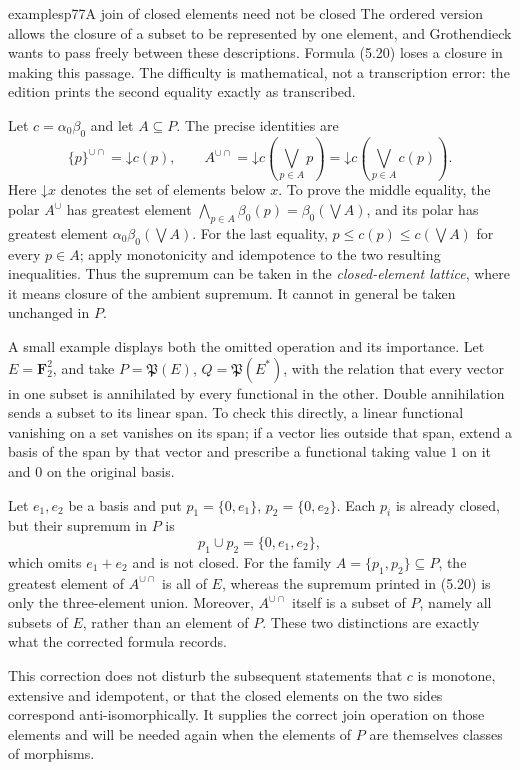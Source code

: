 \begin{dcomment}{examples}{p77}{A join of closed elements need not be closed}
The ordered version allows the closure of a subset to be represented by one element, and Grothendieck wants to pass freely between these descriptions. Formula (5.20) loses a closure in making this passage. The difficulty is mathematical, not a transcription error: the edition prints the second equality exactly as transcribed.

Let $c=\alpha_0\beta_0$ and let $A\subseteq P$. The precise identities are
\[
 \{p\}^{\cup\cap}=\mathord\downarrow c(p),\qquad
 A^{\cup\cap}=\mathord\downarrow c\left(\bigvee_{p\in A}p\right)
 =\mathord\downarrow c\left(\bigvee_{p\in A}c(p)\right).
\]
Here $\mathord\downarrow x$ denotes the set of elements below $x$. To prove the middle equality, the polar $A^\cup$ has greatest element
$\bigwedge_{p\in A}\beta_0(p)=\beta_0(\bigvee A)$, and its polar has greatest element $\alpha_0\beta_0(\bigvee A)$. For the last equality, $p\leq c(p)\leq c(\bigvee A)$ for every $p\in A$; apply monotonicity and idempotence to the two resulting inequalities. Thus the supremum can be taken in the \emph{closed-element lattice}, where it means closure of the ambient supremum. It cannot in general be taken unchanged in $P$.

A small example displays both the omitted operation and its importance. Let $E=\mathbf F_2^2$, and take $P=\mathfrak P(E)$, $Q=\mathfrak P(E^*)$, with the relation that every vector in one subset is annihilated by every functional in the other. Double annihilation sends a subset to its linear span. To check this directly, a linear functional vanishing on a set vanishes on its span; if a vector lies outside that span, extend a basis of the span by that vector and prescribe a functional taking value $1$ on it and $0$ on the original basis.

Let $e_1,e_2$ be a basis and put $p_1=\{0,e_1\}$, $p_2=\{0,e_2\}$. Each $p_i$ is already closed, but their supremum in $P$ is
\[
 p_1\cup p_2=\{0,e_1,e_2\},
\]
which omits $e_1+e_2$ and is not closed. For the family $A=\{p_1,p_2\}\subseteq P$, the greatest element of $A^{\cup\cap}$ is all of $E$, whereas the supremum printed in (5.20) is only the three-element union. Moreover, $A^{\cup\cap}$ itself is a subset of $P$, namely all subsets of $E$, rather than an element of $P$. These two distinctions are exactly what the corrected formula records.

This correction does not disturb the subsequent statements that $c$ is monotone, extensive and idempotent, or that the closed elements on the two sides correspond anti-isomorphically. It supplies the correct join operation on those elements and will be needed again when the elements of $P$ are themselves classes of morphisms.
\end{dcomment}

